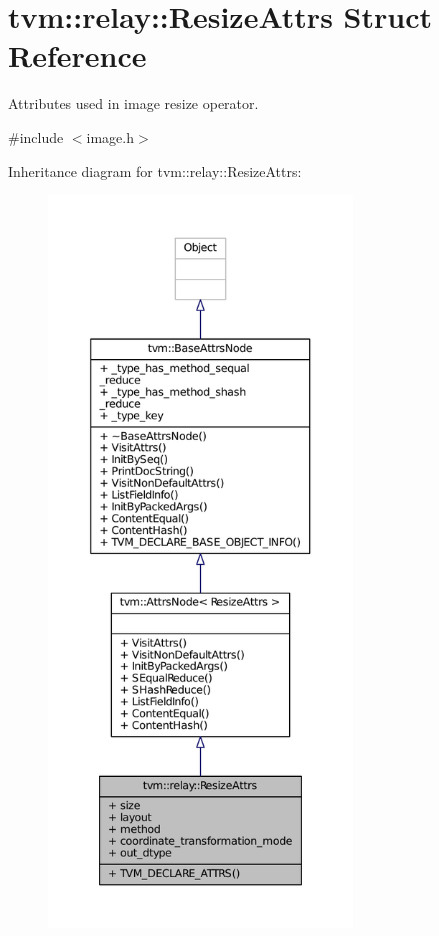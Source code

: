 \hypertarget{structtvm_1_1relay_1_1ResizeAttrs}{}\section{tvm\+:\+:relay\+:\+:Resize\+Attrs Struct Reference}
\label{structtvm_1_1relay_1_1ResizeAttrs}


Attributes used in image resize operator.  




{\ttfamily \#include $<$image.\+h$>$}



Inheritance diagram for tvm\+:\+:relay\+:\+:Resize\+Attrs\+:
\nopagebreak
\begin{figure}[H]
\begin{center}
\leavevmode
\includegraphics[height=550pt]{structtvm_1_1relay_1_1ResizeAttrs__inherit__graph}
\end{center}
\end{figure}


